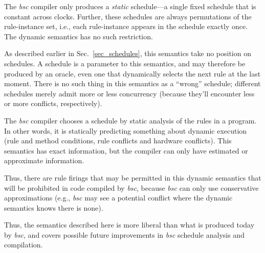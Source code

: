 \documentclass[11pt]{article}
\newcommand{\hdivider}{\noindent\mbox{}\hrulefill\mbox{}}
\begin{document}
The \emph{bsc} compiler only produces a \emph{static} schedule---a
single fixed schedule that is constant across clocks.  Further, these
schedules are always permutations of the rule-instance set, i.e., each
rule-instance appears in the schedule exactly once.  The dynamic
semantics has no such restriction.

As described earlier in Sec.~\ref{sec_schedules}, this semantics take
no position on schedules.  A schedule is a parameter to this
semantics, and may therefore be produced by an oracle, even one that
dynamically selects the next rule at the last moment.  There is no
such thing in this semantics as a ``wrong'' schedule; different
schedules merely admit more or less concurrency (because they'll
encounter less or more conflicts, respectively).

The \emph{bsc} compiler chooses a schedule by static analysis of the
rules in a program.  In other words, it is statically predicting
something about dynamic execution (rule and method conditions, rule
conflicts and hardware conflicts).  This semantics has exact
information, but the compiler can only have estimated or approximate
information.

Thus, there are rule firings that may be permitted in this dynamic
semantics that will be prohibited in code compiled by \emph{bsc},
because \emph{bsc} can only use conservative approximations (e.g.,
\emph{bsc} may see a potential conflict where the dynamic semantics
knows there is none).

Thus, the semantics described here is more liberal than what is
produced today by \emph{bsc}, and covers possible future improvements
in \emph{bsc} schedule analysis and compilation.


\vspace{1cm}

\hdivider



\end{document}
